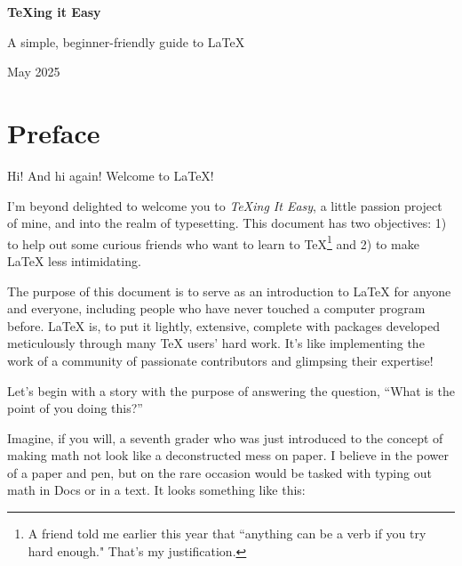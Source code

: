 \documentclass[letterpaper, 12pt]{article}
\begin{document}
\begin{titlepage}
    \centering
    \vspace*{2cm}
    {\Huge \bfseries \TeX ing it Easy\par}
    \vspace{2cm}
    {\Large A simple, beginner-friendly guide to \LaTeX \par}
    \vfill
    {\large May 2025\par}
\end{titlepage}

\tableofcontents

\fancyhf{}
\fancyfoot[C]{\thepage}

\nocite{*}

\newpage

\section*{Preface}

\fancyhf{}
\fancyfoot[C]{\thepage}


Hi! And hi again! Welcome to \LaTeX!

I'm beyond delighted to welcome you to \textit{\TeX ing It Easy}, a little passion project of mine, and into the realm of typesetting. This document has two objectives: 1) to help out some curious friends who want to learn to \TeX\footnote{A friend told me earlier this year that ``anything can be a verb if you try hard enough." That's my justification.} and 2) to make \LaTeX{} less intimidating.

The purpose of this document is to serve as an introduction to \LaTeX{} for anyone and everyone, including people who have never touched a computer program before. \LaTeX{} is, to put it lightly, extensive, complete with packages developed meticulously through many \TeX{} users' hard work. It's like implementing the work of a community of passionate contributors and glimpsing their expertise!

Let's begin with a story with the purpose of answering the question, ``What is the point of you doing this?''

Imagine, if you will, a seventh grader who was just introduced to the concept of making math not look like a deconstructed mess on paper. I believe in the power of a paper and pen, but on the rare occasion would be tasked with typing out math in Docs or in a text. It looks something like this:
\end{document}
